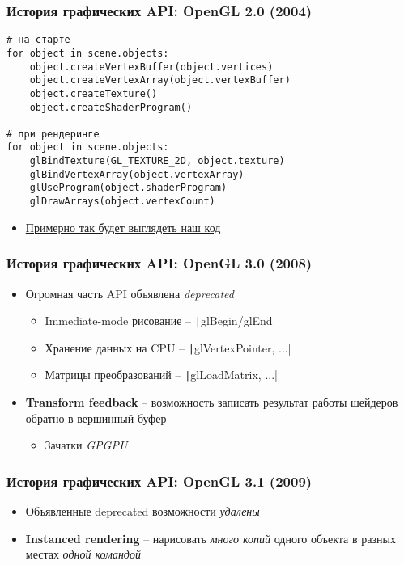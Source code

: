 \documentclass[10pt]{beamer}
\begin{document}
\begin{frame}[fragile]
\frametitle{История графических API: OpenGL 2.0 (2004)}
\begin{verbatim}
# на старте
for object in scene.objects:
    object.createVertexBuffer(object.vertices)
    object.createVertexArray(object.vertexBuffer)
    object.createTexture()
    object.createShaderProgram()

# при рендеринге
for object in scene.objects:
    glBindTexture(GL_TEXTURE_2D, object.texture)
    glBindVertexArray(object.vertexArray)
    glUseProgram(object.shaderProgram)
    glDrawArrays(object.vertexCount)
\end{verbatim}
\pause
\begin{itemize}
\item \underline{Примерно так будет выглядеть наш код}
\end{itemize}
\end{frame}

\begin{frame}[fragile]
\frametitle{История графических API: OpenGL 3.0 (2008)}
\begin{itemize}
\item Огромная часть API объявлена \textit{deprecated}
\pause
\begin{itemize}
\item Immediate-mode рисование -- \texttt|glBegin/glEnd|
\item Хранение данных на CPU -- \texttt|glVertexPointer, ...|
\item Матрицы преобразований -- \texttt|glLoadMatrix, ...|
\end{itemize}
\pause
\item \textbf{Transform feedback} -- возможность записать результат работы шейдеров обратно в вершинный буфер
\begin{itemize}
\item Зачатки \textit{GPGPU}
\end{itemize}
\end{itemize}
\end{frame}

\begin{frame}
\frametitle{История графических API: OpenGL 3.1 (2009)}
\begin{itemize}
\item Объявленные deprecated возможности \textit{удалены}
\pause
\item \textbf{Instanced rendering} -- нарисовать \textit{много копий} одного объекта в разных местах \textit{одной командой}
\end{itemize}
\end{frame}
\end{document}
